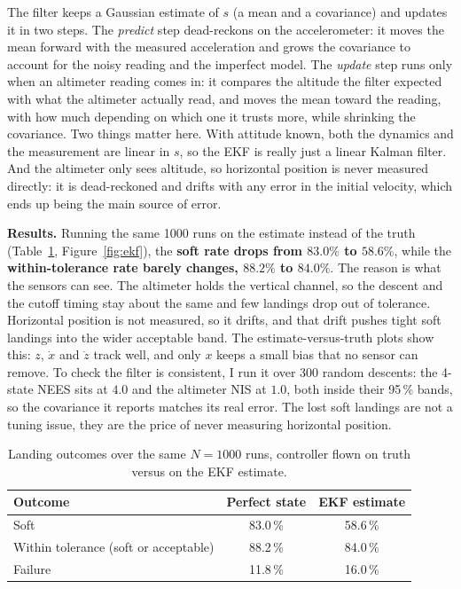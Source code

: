 \documentclass[11pt]{article}
\begin{document}
The filter keeps a Gaussian estimate of $s$ (a mean and a covariance) and updates it in two steps. The \emph{predict} step dead-reckons on the accelerometer: it moves the mean forward with the measured acceleration and grows the covariance to account for the noisy reading and the imperfect model. The \emph{update} step runs only when an altimeter reading comes in: it compares the altitude the filter expected with what the altimeter actually read, and moves the mean toward the reading, with how much depending on which one it trusts more, while shrinking the covariance. Two things matter here. With attitude known, both the dynamics and the measurement are linear in $s$, so the EKF is really just a linear Kalman filter. And the altimeter only sees altitude, so horizontal position is never measured directly: it is dead-reckoned and drifts with any error in the initial velocity, which ends up being the main source of error.

\textbf{Results.} Running the same 1000 runs on the estimate instead of the truth (Table~\ref{tab:compare}, Figure~\ref{fig:ekf}), the \textbf{soft rate drops from $83.0\%$ to $58.6\%$}, while the \textbf{within-tolerance rate barely changes, $88.2\%$ to $84.0\%$}. The reason is what the sensors can see. The altimeter holds the vertical channel, so the descent and the cutoff timing stay about the same and few landings drop out of tolerance. Horizontal position is not measured, so it drifts, and that drift pushes tight soft landings into the wider acceptable band. The estimate-versus-truth plots show this: $z$, $\dot x$ and $\dot z$ track well, and only $x$ keeps a small bias that no sensor can remove. To check the filter is consistent, I run it over 300 random descents: the 4-state NEES sits at $4.0$ and the altimeter NIS at $1.0$, both inside their 95\,\% bands, so the covariance it reports matches its real error. The lost soft landings are not a tuning issue, they are the price of never measuring horizontal position.

\begin{table}[H]\centering\small
\begin{tabular}{lcc}
\hline
Outcome & Perfect state & EKF estimate\\
\hline
Soft                                   & 83.0\,\% & 58.6\,\%\\
Within tolerance (soft or acceptable)  & 88.2\,\% & 84.0\,\%\\
Failure                                & 11.8\,\% & 16.0\,\%\\
\hline
\end{tabular}
\caption{Landing outcomes over the same $N=1000$ runs, controller flown on truth versus on the EKF estimate.}
\label{tab:compare}
\end{table}
\end{document}

